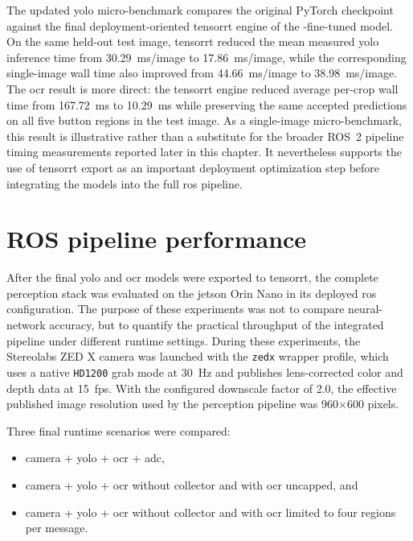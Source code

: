 The updated \gls{yolo} micro-benchmark compares the original PyTorch checkpoint
against the final deployment-oriented \gls{tensorrt} engine of the
-fine-tuned model. On the same held-out test image,
\gls{tensorrt} reduced the mean measured \gls{yolo} inference time from
30.29~ms/image to 17.86~ms/image, while the corresponding single-image wall time
also improved from 44.66~ms/image to 38.98~ms/image. The \gls{ocr} result is
more direct: the \gls{tensorrt} engine reduced average per-crop wall time from
167.72~ms to 10.29~ms while preserving the same accepted predictions on all five
button regions in the test image. As a single-image micro-benchmark, this result
is illustrative rather than a substitute for the broader ROS~2 pipeline timing
measurements reported later in this chapter. It nevertheless supports the use of
\gls{tensorrt} export as an important deployment optimization step before
integrating the models into the full \gls{ros} pipeline.

\section{ROS pipeline performance}
\label{sec:ros_pipeline_results}

After the final \gls{yolo} and \gls{ocr} models were exported to \gls{tensorrt}, the complete
perception stack was evaluated on the \gls{jetson} Orin Nano in its deployed \gls{ros}
configuration. The purpose of these experiments was not to compare neural-network
accuracy, but to quantify the practical throughput of the integrated pipeline under
different runtime settings. During these experiments, the Stereolabs ZED X camera was
launched with the \texttt{zedx} wrapper profile, which uses a native
    \texttt{HD1200} grab mode at 30~Hz and publishes lens-corrected color and depth data at
15~\gls{fps}. With the configured downscale factor of 2.0, the effective published
image resolution used by the perception pipeline was 960$\times$600 pixels.

Three final runtime scenarios were compared:
\begin{itemize}
    \item camera + \gls{yolo} + \gls{ocr} + \gls{adc},
    \item camera + \gls{yolo} + \gls{ocr} without collector and with \gls{ocr} uncapped, and
    \item camera + \gls{yolo} + \gls{ocr} without collector and with \gls{ocr} limited to four regions per message.
\end{itemize}

